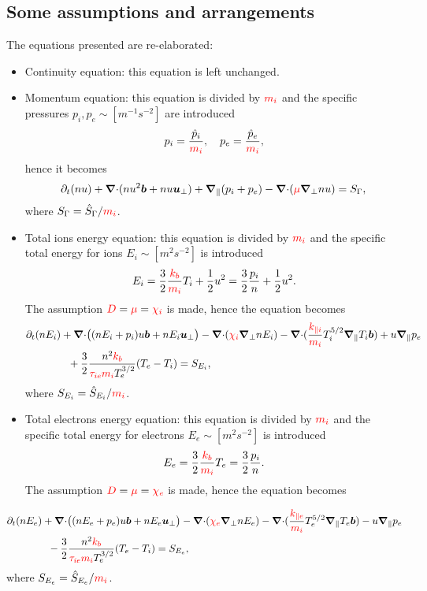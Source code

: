 \documentclass[a4paper,10pt]{article}
\newcommand{\bm}[1]{\text{\boldmath$#1$\unboldmath}}
\newcommand{\bu}{\bm{u}}
\newcommand{\Div}{{\bm{\nabla}\cdot}}
\newcommand{\Grad}{\bm{\nabla}}
\renewcommand{\b}{\bm{b}}
\newcommand{\qq}{\qquad\qquad}
\newcommand{\Gradpar}{\Grad_{\parallel}}
\newcommand{\Gradper}{\Grad_{\perp}}
\newcommand{\Gm}{\Gamma}
\newcommand{\yd}[1]{{\color{red} #1\color{black}}} %
\def\kb{\yd{k_b}}
\def\mi{\yd{m_i}}
\def\kpi{\yd{k_{\parallel i}}}
\def\kpe{\yd{k_{\parallel e}}}
\def\drho{\yd{D}}
\def\dcon{\yd{\mu}}
\def\denei{\yd{\chi_i}}
\def\denee{\yd{\chi_e}}
\def\tie{\yd{\tau_{ie}}}
\begin{document}
\subsection{Some assumptions and arrangements}
The equations presented are re-elaborated: 
\begin{itemize}
 \item Continuity equation: this equation is left unchanged. 
 \item Momentum equation: this equation is divided by $\mi$ and the specific pressures $p_i,p_e \sim [m^{-1}s^{-2}]$ are introduced
 \begin{equation}
  p_i = \frac{\hat{p}_i}{\mi}, \quad p_e = \frac{\hat{p}_e}{\mi},
 \end{equation}
 hence it becomes
 \begin{equation}
  \partial_t (nu)  + \Div (nu^2\b + nu \bu_\bot) +  \Gradpar(p_i+p_e) - \Div (\dcon \Gradper nu) =S_{\Gm},\\
 \end{equation}
 where $S_{\Gm} = \hat{S}_{\Gm}/\mi$.
 \item Total ions energy equation: this equation is divided by $\mi$ and the specific total energy for ions $E_i\sim [m^2 s^{-2}]$ is introduced 
 \begin{equation}
  E_i = \frac{3}{2}\frac{\kb}{\mi} T_i+\frac{1}{2} u^2 = \frac{3}{2} \frac{p_i}{n}+\frac{1}{2} u^2.
 \end{equation}
 The assumption $\drho=\dcon=\denei$ is made, hence the equation becomes
 \begin{equation}
 \begin{aligned}
  &\partial_t (nE_i)  + \Div \big( (nE_i+p_i)u\b + nE_i \bu_\bot \big) - \Div (\denei \Gradper nE_i) - \Div (\frac{\kpi}{\mi} T_i^{5/2}\Gradpar T_i\b) +u\Gradpar p_e\\ &\qq+ \frac{3}{2}\frac{n^2 \kb}{\tie \mi T_e^{3/2}}(T_e-T_i) =S_{E_i},
 \end{aligned}
 \end{equation}
 where $S_{E_i} = \hat{S}_{E_i}/\mi$.

 \item Total electrons energy equation: this equation is divided by $\mi$ and the specific total energy for electrons $E_e\sim [m^2 s^{-2}]$ is introduced 
 \begin{equation}
  E_e = \frac{3}{2}\frac{\kb}{\mi} T_e = \frac{3}{2} \frac{p_i}{n}.
 \end{equation}
 The assumption $\drho=\dcon=\denee$ is made, hence the equation becomes
\end{itemize}
 \begin{equation}
 \begin{aligned}
&\partial_t (nE_e)  + \Div \big( (nE_e+p_e)u\b + nE_e \bu_\bot \big) - \Div (\denee \Gradper nE_e) - \Div (\frac{\kpe}{\mi} T_e^{5/2}\Gradpar T_e\b) -u\Gradpar p_e\\ &\qq-\frac{3}{2}\frac{n^2 \kb}{\tie\mi T_e^{3/2}}(T_e-T_i)=S_{E_e},
 \end{aligned}
 \end{equation}
 where $S_{E_e} = \hat{S}_{E_e}/\mi$.
 
\end{document}
